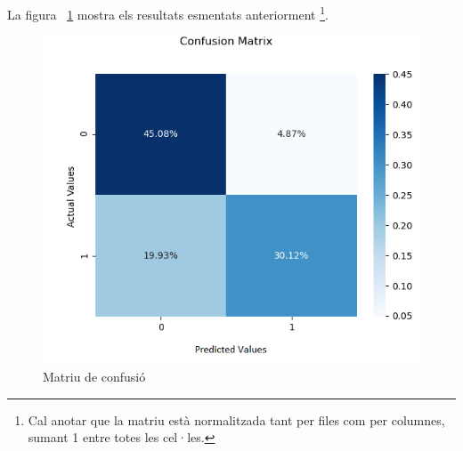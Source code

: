 La figura ~\ref{fig:matriuConfusio} mostra els resultats esmentats anteriorment \footnote{Cal anotar que  la matriu està normalitzada tant per files com per columnes, sumant 1 entre totes les cel·les.}.
\begin{figure}[ht]
    \centering
    \includegraphics[width=\textwidth,height=\textheight,keepaspectratio]{images/image2.png}
    \caption{Matriu de confusió}
    \label{fig:matriuConfusio}
\end{figure}